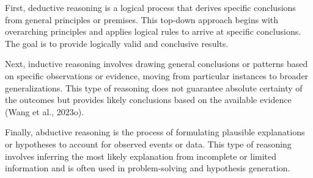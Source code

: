 First, deductive reasoning is a logical process that derives specific conclusions from general principles or premises. This top-down approach begins with overarching principles and applies logical rules to arrive at specific conclusions. The goal is to provide logically valid and conclusive results.

Next, inductive reasoning involves drawing general conclusions or patterns based on specific observations or evidence, moving from particular instances to broader generalizations. This type of reasoning does not guarantee absolute certainty of the outcomes but provides likely conclusions based on the available evidence (Wang et al., 2023o).

Finally, abductive reasoning is the process of formulating plausible explanations or hypotheses to account for observed events or data. This type of reasoning involves inferring the most likely explanation from incomplete or limited information and is often used in problem-solving and hypothesis generation.

